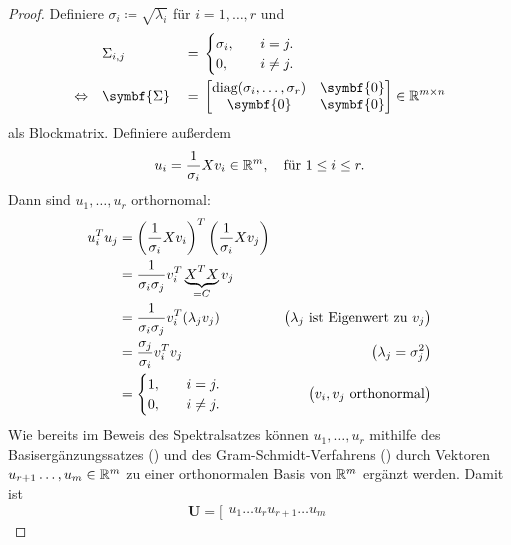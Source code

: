 \begin{proof}
    \noindent Definiere \(\sigma_i \coloneq \sqrt{\lambda_i}\) für \(i = 1,\ldots,r\) und
    \begin{alignat*}{2}
        &\Sigma_{i,j} &{}={}& 
            \begin{cases}
                \sigma_i, \quad &i=j. \\
                0, \quad &i \neq j.
            \end{cases} \\
        \Lra \quad &\symbf{\Sigma} &{}={}&  
        \begin{bmatrix}
            \text{diag}(\sigma_i,\ldots,\sigma_r) & \symbf{0} \\
            \symbf{0} & \symbf{0}
        \end{bmatrix}
        \in \R^{m \times n}
    \end{alignat*}
    als Blockmatrix.
    Definiere außerdem
    \begin{equation*}
        u_i = \frac{1}{\sigma_i}Xv_i \in \mathbb{R}^{m}, \quad \text{für } 1 \leq i \leq r.
    \end{equation*}
    Dann sind \(u_1,\ldots,u_r\) orthornomal:
    \begin{align*}
        u_i^{T}u_j &= {\left(\frac{1}{\sigma_i}Xv_i\right)}^{T}\left(\frac{1}{\sigma_i}Xv_j\right) \\
        &= \frac{1}{\sigma_i \sigma_j}v_i^{T}\underbrace{X^{\raisebox{0.2ex}{\(\scriptstyle{T}\)}}X}_{=C}v_j \\
        &= \frac{1}{\sigma_i\sigma_j}v_i^{T}(\lambda_j v_j) & \bigl(\lambda_j \text{ ist Eigenwert zu } v_j \bigr) \\
        &= \frac{\sigma_j}{\sigma_i}v_i^{T}v_j & \bigl(\lambda_j = \sigma_j^{2}\bigr) \\
        &=
        \begin{cases}
            1, \quad & i=j. \\
            0, \quad & i \neq j.
        \end{cases} & \bigl(v_i,v_j \text{ orthonormal}\bigr)
    \end{align*}
    Wie bereits im Beweis des Spektralsatzes können \(u_1,\ldots,u_r\) mithilfe des Basisergänzungssatzes () und des Gram-Schmidt-Verfahrens () durch Vektoren \(u_{r+1}\ldots,u_m \in \mathbb{R}^{m}\) zu einer orthonormalen Basis von \(\mathbb{R}^{m}\) ergänzt werden.
    Damit ist 
    \begin{equation*}
        \symbf{U} =
        \big[
        \begin{matrix}
            u_1 \dots u_{r}u_{r+1} \dots u_m

\end{matrix}
\end{equation*}
\end{proof}
